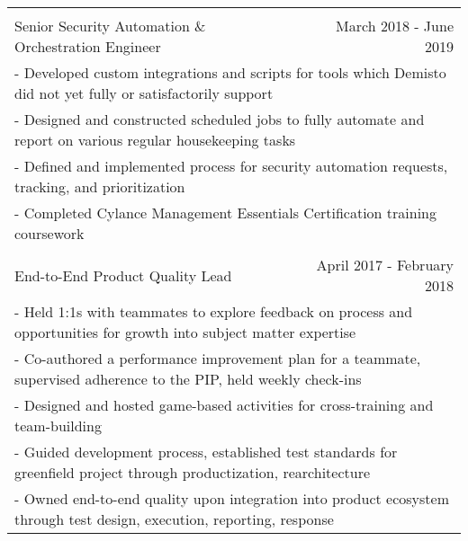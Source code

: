 \documentclass[letterpaper]{article}
\begin{document}
\begin{center}
\begin{tabular}{p{}p{}r}
			\\
			\\
				\multicolumn{2}{p{0.5\textwidth}}{\quad Senior Security Automation \& Orchestration Engineer}
				&
				{March 2018 - June 2019 \quad\quad\quad\quad}
			\\
				\multicolumn{3}{p{\textwidth}}{\quad\quad - Developed custom integrations and scripts for tools which Demisto did not yet fully or satisfactorily support}
			\\
				\multicolumn{3}{p{\textwidth}}{\quad\quad - Designed and constructed scheduled jobs to fully automate and report on various regular housekeeping tasks}
			\\
				\multicolumn{3}{p{\textwidth}}{\quad\quad - Defined and implemented process for security automation requests, tracking, and prioritization}
			\\
				\multicolumn{3}{p{\textwidth}}{\quad\quad - Completed Cylance Management Essentials Certification training coursework}
			\\
			\\		%
				\multicolumn{2}{p{0.5\textwidth}}{\quad End-to-End Product Quality Lead}
				&
				{April 2017 - February 2018 \quad\quad\quad\quad} 
			\\
				\multicolumn{3}{p{\textwidth}}{\quad\quad - Held 1:1s with teammates to explore feedback on process and opportunities for growth into subject matter expertise} 
			\\
				\multicolumn{3}{p{\textwidth}}{\quad\quad - Co-authored a performance improvement plan for a teammate, supervised adherence to the PIP, held weekly check-ins} 
			\\
				\multicolumn{3}{p{\textwidth}}{\quad\quad - Designed and hosted game-based activities for cross-training and team-building} 
			\\
				\multicolumn{3}{p{\textwidth}}{\quad\quad - Guided development process, established test standards for greenfield project through productization, rearchitecture} 
			\\
				\multicolumn{3}{p{\textwidth}}{\quad\quad - Owned end-to-end quality upon integration into product ecosystem through test design, execution, reporting, response} 

\end{tabular}
\end{center}
\end{document}
